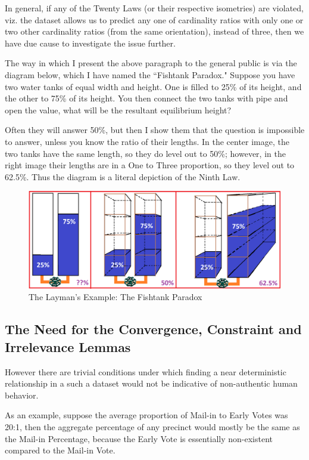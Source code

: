 In general, if any of the Twenty Laws (or their respective isometries) are violated, viz. the dataset allows us to predict any one of cardinality ratios with only one or two other cardinality ratios (from the same orientation), instead of three, then we have due cause to investigate the issue further.

The way in which I present the above paragraph to the general public is via the diagram below, which I have named the ``Fishtank Paradox."  Suppose you have two water tanks of equal width and height. One is filled to 25\% of its height, and the other to 75\% of its height. You then connect the two tanks with pipe and open the value, what will be the resultant equilibrium height?

Often they will answer 50\%, but then I show them that the question is impossible to answer, unless you know the ratio of their lengths. In the center image, the two tanks have the same length, so they do level out to 50\%; however, in the right image their lengths are in a One to Three proportion, so they level out to 62.5\%. Thus the diagram is a literal depiction of the Ninth Law.
\begin{figure}[bp!]
\begin{center}
\caption{The Layman's Example: The Fishtank Paradox}
\includegraphics[width=350pt]{Fishtank.png}
\end{center}
\end{figure}

\newpage
\subsection{The Need for the Convergence, Constraint and Irrelevance Lemmas}
However there are trivial conditions under which finding a near deterministic relationship in a such a dataset would not be indicative of non-authentic human behavior.

As an example, suppose the average proportion of Mail-in to Early Votes was 20:1, then the aggregate percentage of any precinct would mostly be the same as the Mail-in Percentage, because the Early Vote is essentially non-existent compared to the Mail-in Vote.

